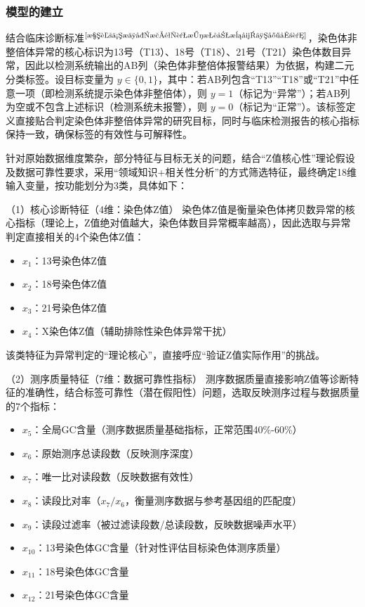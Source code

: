 \documentclass[withoutpreface,bwprint]{cumcmthesis} %
\begin{document}
\subsubsection{模型的建立}

结合临床诊断标准$^\text{\cite{染色体核型检验诊断报告模式专家共识}}$，染色体非整倍体异常的核心标识为13号（T13）、18号（T18）、21号（T21）染色体数目异常，因此以检测系统输出的AB列（染色体非整倍体报警结果）为依据，构建二元分类标签。设目标变量为 $ y \in \{0,1\} $，其中：若AB列包含“T13”“T18”或“T21”中任意一项（即检测系统提示染色体非整倍体），则 $ y=1 $（标记为“异常”）；若AB列为空或不包含上述标识（检测系统未报警），则 $ y=0 $（标记为“正常”）。该标签定义直接贴合判定染色体非整倍体异常的研究目标，同时与临床检测报告的核心指标保持一致，确保标签的有效性与可解释性。

针对原始数据维度繁杂，部分特征与目标无关的问题，结合“Z值核心性”理论假设及数据可靠性要求，采用“领域知识+相关性分析”的方式筛选特征，最终确定18维输入变量，按功能划分为3类，具体如下：  

（1）核心诊断特征（4维：染色体Z值）  
染色体Z值是衡量染色体拷贝数异常的核心指标（理论上，Z值绝对值越大，染色体数目异常概率越高），因此选取与异常判定直接相关的4个染色体Z值：  
\begin{itemize}
    \item \quad $ x_1 $：13号染色体Z值  
    \item \quad $ x_2 $：18号染色体Z值  
    \item \quad $ x_3 $：21号染色体Z值  
    \item \quad $ x_4 $：X染色体Z值（辅助排除性染色体异常干扰）  
\end{itemize}

该类特征为异常判定的“理论核心”，直接呼应“验证Z值实际作用”的挑战。

（2）测序质量特征（7维：数据可靠性指标）  
测序数据质量直接影响Z值等诊断特征的准确性，结合标签可靠性（潜在假阳性）问题，选取反映测序过程与数据质量的7个指标：  
\begin{itemize}
    \item $ x_5 $：全局GC含量（测序数据质量基础指标，正常范围40\%-60\%）
    \item $ x_6 $：原始测序总读段数（反映测序深度）
    \item $ x_7 $：唯一比对读段数（反映数据有效性）
    \item $ x_8 $：读段比对率（$ x_7/x_6 $，衡量测序数据与参考基因组的匹配度）
    \item $ x_9 $：读段过滤率（被过滤读段数/总读段数，反映数据噪声水平）
    \item $ x_{10} $：13号染色体GC含量（针对性评估目标染色体测序质量）
    \item $ x_{11} $：18号染色体GC含量
    \item $ x_{12} $：21号染色体GC含量
\end{itemize}
  
\end{document}
